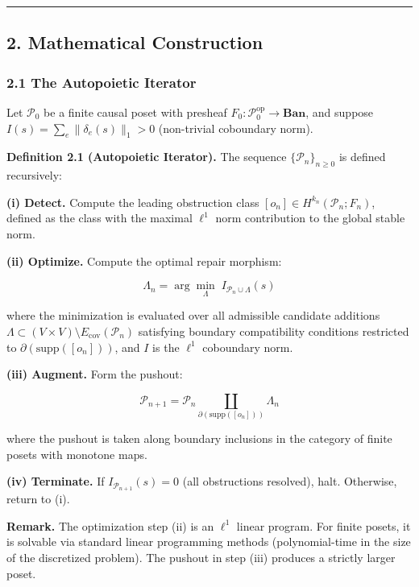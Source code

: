 \documentclass[
]{article}
\begin{document}
\begin{center}\rule{0.5\linewidth}{0.5pt}\end{center}

\subsection{2. Mathematical
Construction}\label{mathematical-construction}

\subsubsection{2.1 The Autopoietic
Iterator}\label{the-autopoietic-iterator}

Let \(\mathcal{P}_0\) be a finite causal poset with presheaf
\(F_0: \mathcal{P}_0^{\text{op}} \to \mathbf{Ban}\), and suppose
\(I(s) = \sum_e \|\delta_e(s)\|_1 > 0\) (non-trivial coboundary norm).

\textbf{Definition 2.1 (Autopoietic Iterator).} The sequence
\(\{\mathcal{P}_n\}_{n \geq 0}\) is defined recursively:

\textbf{(i) Detect.} Compute the leading obstruction class
\([o_n] \in H^{k_n}(\mathcal{P}_n; F_n)\), defined as the class with the
maximal \(\ell^1\) norm contribution to the global stable norm.

\textbf{(ii) Optimize.} Compute the optimal repair morphism:

\[\Lambda_n = \arg\min_{\Lambda} \; I_{\mathcal{P}_n \cup \Lambda}(s)\]

where the minimization is evaluated over all admissible candidate
additions
\(\Lambda \subset (V \times V) \setminus E_{\text{cov}}(\mathcal{P}_n)\)
satisfying boundary compatibility conditions restricted to
\(\partial(\text{supp}([o_n]))\), and \(I\) is the \(\ell^1\) coboundary
norm.

\textbf{(iii) Augment.} Form the pushout:

\[\mathcal{P}_{n+1} = \mathcal{P}_n \coprod_{\partial(\text{supp}([o_n]))} \Lambda_n\]

where the pushout is taken along boundary inclusions in the category of
finite posets with monotone maps.

\textbf{(iv) Terminate.} If \(I_{\mathcal{P}_{n+1}}(s) = 0\) (all
obstructions resolved), halt. Otherwise, return to (i).

\textbf{Remark.} The optimization step (ii) is an \(\ell^1\) linear
program. For finite posets, it is solvable via standard linear
programming methods (polynomial-time in the size of the discretized
problem). The pushout in step (iii) produces a strictly larger poset.
\end{document}
